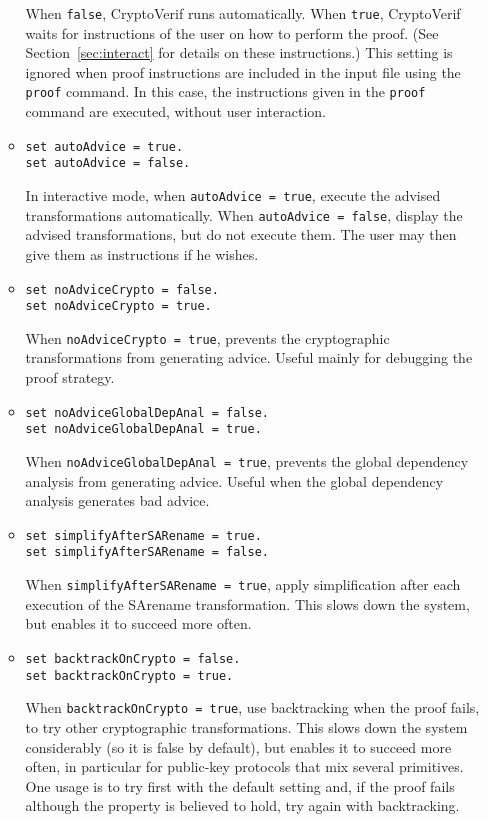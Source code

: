 \begin{itemize}
\begin{itemize}
When {\tt false}, CryptoVerif runs automatically.
When {\tt true}, CryptoVerif waits for instructions of the user
on how to perform the proof. (See Section~\ref{sec:interact}
for details on these instructions.)
%
This setting is ignored when proof instructions are included
in the input file using the \texttt{proof} command.
In this case, the instructions given in the \texttt{proof} command
are executed, without user interaction.

\item \texttt{set autoAdvice = true.}\\
\texttt{set autoAdvice = false.}

In interactive mode, when \texttt{autoAdvice = true}, execute the
advised transformations automatically. When \texttt{autoAdvice = false},
display the advised transformations, but do not execute them.
The user may then give them as instructions if he wishes.

\item \texttt{set noAdviceCrypto = false.}\\
\texttt{set noAdviceCrypto = true.}

When \texttt{noAdviceCrypto = true}, prevents the cryptographic 
transformations from generating advice. Useful mainly for debugging
the proof strategy.

\item \texttt{set noAdviceGlobalDepAnal = false.}\\
\texttt{set noAdviceGlobalDepAnal = true.}

When \texttt{noAdviceGlobalDepAnal = true}, prevents the global
dependency analysis from generating advice. Useful when the global
dependency analysis generates bad advice.

\item \texttt{set simplifyAfterSARename = true.}\\
\texttt{set simplifyAfterSARename = false.}

When \texttt{simplifyAfterSARename = true}, apply simplification after
each execution of the SArename transformation. This slows down
the system, but enables it to succeed more often.

\item \texttt{set backtrackOnCrypto = false.}\\
\texttt{set backtrackOnCrypto = true.}

When \texttt{backtrackOnCrypto = true}, use backtracking when the proof
fails, to try other cryptographic transformations. This slows down
the system considerably (so it is false by default), but enables
it to succeed more often, in particular for public-key protocols
that mix several primitives. One usage is to try first with the default
setting and, if the proof fails although the property
is believed to hold, try again with backtracking.


\end{itemize}
\end{itemize}
